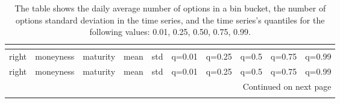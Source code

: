 \begin{longtable}{llrrrrrrrr}
    \caption{The table shows the daily average number of options in a 
    bin bucket, the number of options standard deviation in 
    the time series, and the time series's quantiles for the following values: 
    0.01, 0.25, 0.50, 0.75, 0.99.} \\
\label{table:bins_count}\\
\toprule
right & moneyness &  maturity &  mean &   std &  q=0.01 &  q=0.25 &  q=0.5 &  q=0.75 &  q=0.99 \\
\midrule
\endfirsthead
\toprule
right & moneyness &  maturity &  mean &   std &  q=0.01 &  q=0.25 &  q=0.5 &  q=0.75 &  q=0.99 \\
\midrule
\endhead
\midrule
\multicolumn{10}{r}{{Continued on next page}} \\
\midrule
\endfoot


\end{longtable}
